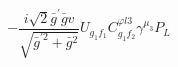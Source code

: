 %
\begin{dmath*}
%
  -  \frac{i \sqrt{2} {\bar g}^\prime {\bar g}{} v}{\sqrt{{\bar g}^{\prime 2} + {\bar g}{}^2}}U_{g_1 f_1} C^{ \varphi  l3}_{g_1 f_2} \gamma^{\mu_3} P_L
%
\end{dmath*}
%
